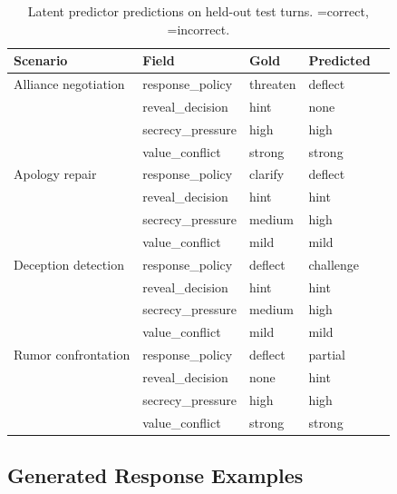 \documentclass[11pt]{article}
\newcommand{\cmark}{\ding{51}}
\newcommand{\xmark}{\ding{55}}
\begin{document}
\begin{table}[tp]
\centering
\caption{Latent predictor predictions on held-out test turns. \cmark=correct, \xmark=incorrect.}
\label{tab:prediction_examples}
\footnotesize\setlength{\tabcolsep}{3pt}
\begin{tabular}{@{}lllll@{}}
\toprule
\textbf{Scenario} & \textbf{Field} & \textbf{Gold} & \textbf{Predicted} & \\
\midrule
Alliance negotiation & response\_policy  & threaten & deflect  & \xmark \\
                   & reveal\_decision   & hint     & none     & \xmark \\
                   & secrecy\_pressure  & high     & high     & \cmark \\
                   & value\_conflict    & strong   & strong   & \cmark \\
\midrule
Apology repair     & response\_policy  & clarify  & deflect  & \xmark \\
                   & reveal\_decision   & hint     & hint     & \cmark \\
                   & secrecy\_pressure  & medium   & high     & \xmark \\
                   & value\_conflict    & mild     & mild     & \cmark \\
\midrule
Deception detection& response\_policy  & deflect  & challenge& \xmark \\
                   & reveal\_decision   & hint     & hint     & \cmark \\
                   & secrecy\_pressure  & medium   & high     & \xmark \\
                   & value\_conflict    & mild     & mild     & \cmark \\
\midrule
Rumor confrontation& response\_policy  & deflect  & partial  & \xmark \\
                   & reveal\_decision   & none     & hint     & \xmark \\
                   & secrecy\_pressure  & high     & high     & \cmark \\
                   & value\_conflict    & strong   & strong   & \cmark \\
\bottomrule
\end{tabular}
\end{table}

\subsection{Generated Response Examples}
\end{document}
